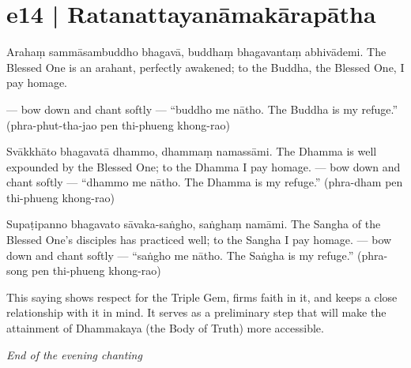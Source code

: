 \section*{e14 | Ratanattayanāmakārapātha}

\begin{chantsubsection}
  \chantnote
    {Arahaṃ sammāsambuddho bhagavā, buddhaṃ bhagavantaṃ abhivādemi.}
  \chantnotetrans
    {The Blessed One is an arahant, perfectly awakened; to the Buddha, the Blessed One, I pay homage.}
    
  \chantgap
  \chantnote
    {--- bow down and chant softly ---}
  \chantnote
    {“buddho me nātho.}
  \chantnote
    {The Buddha is my refuge.”}
  \chantindent
    {(phra-phut-tha-jao pen thi-phueng khong-rao)}
  \chantgap
  \chantgap
  
  \chantnote
    {Svākkhāto bhagavatā dhammo, dhammaṃ namassāmi.}
  \chantnotetrans
    {The Dhamma is well expounded by the Blessed One; to the Dhamma I pay homage.}
  \chantnote
    {--- bow down and chant softly ---}
  \chantnote
    {“dhammo me nātho.}
  \chantnote
    {The Dhamma is my refuge.”}
  \chantindent
    {(phra-dham pen thi-phueng khong-rao)}
  \chantgap
  \chantgap
  
  \chantnote
    {Supaṭipanno bhagavato sāvaka-saṅgho, saṅghaṃ namāmi.}
  \chantnotetrans
    {The Sangha of the Blessed One's disciples has practiced well; to the Sangha I pay homage.}
  \chantnote
    {--- bow down and chant softly ---}
  \chantnote
    {“saṅgho me nātho.}
  \chantnote
    {The Saṅgha is my refuge.”}
  \chantindent
    {(phra-song pen thi-phueng khong-rao)}
\end{chantsubsection}

\chantgap
\chantgap
{\englishstyle
This saying shows respect for the Triple Gem, firms faith in it, and keeps a close relationship with it in mind. It serves as a preliminary step that will make the attainment of Dhammakaya (the Body of Truth) more accessible.}

\chantgap
\chantgap
{\englishstyle\textit{End of the evening chanting}
}

